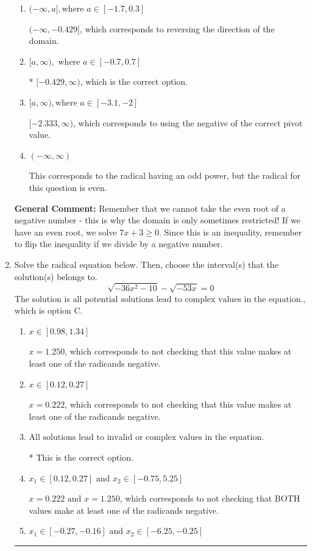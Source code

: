 \documentclass{extbook}[14pt]
\newcommand{\litem}[1]{\item #1

\rule{\textwidth}{0.4pt}}
\begin{document}
\begin{enumerate}
{\begin{enumerate}[label=\Alph*.]
$(-\infty, -2.333]$, which corresponds to reversing the direction of the domain AND using the negative of the correct pivot value.
\item \( (-\infty, a], \text{where } a \in [-1.7, 0.3] \)

 $(-\infty, -0.429]$, which corresponds to reversing the direction of the domain.
\item \( [a, \infty), \text{ where } a \in [-0.7, 0.7] \)

* $[-0.429, \infty)$, which is the correct option.
\item \( [a, \infty), \text{where } a \in [-3.1, -2] \)

$[-2.333, \infty)$, which corresponds to using the negative of the correct pivot value.
\item \( (-\infty, \infty) \)

This corresponds to the radical having an odd power, but the radical for this question is even.
\end{enumerate}

\textbf{General Comment:} Remember that we cannot take the even root of a negative number - this is why the domain is only sometimes restricted! If we have an even root, we solve $7 x + 3 \geq 0$. Since this is an inequality, remember to flip the inequality if we divide by a negative number.
}
\litem{
Solve the radical equation below. Then, choose the interval(s) that the solution(s) belongs to.
\[ \sqrt{-36 x^2 - 10} - \sqrt{-53 x} = 0 \]The solution is \( \text{all potential solutions lead to complex values in the equation.} \), which is option C.\begin{enumerate}[label=\Alph*.]
\item \( x \in [0.98,1.34] \)

$x = 1.250$, which corresponds to not checking that this value makes at least one of the radicands negative.
\item \( x \in [0.12,0.27] \)

$x = 0.222$, which corresponds to not checking that this value makes at least one of the radicands negative.
\item \( \text{All solutions lead to invalid or complex values in the equation.} \)

* This is the correct option.
\item \( x_1 \in [0.12, 0.27] \text{ and } x_2 \in [-0.75,5.25] \)

$x = 0.222 \text{ and } x = 1.250$, which corresponds to not checking that BOTH values make at least one of the radicands negative.
\item \( x_1 \in [-0.27, -0.16] \text{ and } x_2 \in [-6.25,-0.25] \)


\end{enumerate}}
\end{enumerate}
\end{document}
